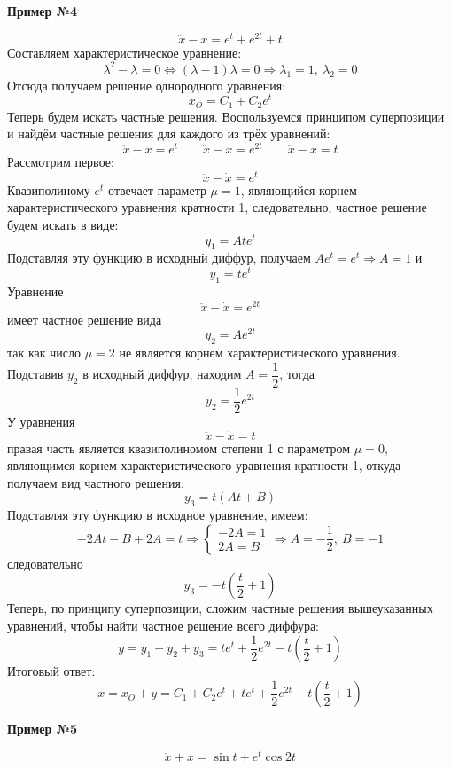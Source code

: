 \documentclass[a4paper,12pt]{article}
\newcommand{\dx}{\dot{x}}
\newcommand{\ddx}{\ddot{x}}
\newcommand{\bto}{\Longrightarrow}
\begin{document}
\textbf{Пример №4}

\[\ddx - \dx = e^t + e^{2t} + t \]
Составляем характеристическое уравнение:
\[\lambda^2 - \lambda = 0 \iff (\lambda - 1)\lambda = 0 \bto \lambda_1 = 1,\ \lambda _2 = 0\]
Отсюда получаем решение однородного уравнения:
\[x_O = C_1 + C_2e^t\]
Теперь будем искать частные решения. 
Воспользуемся принципом суперпозиции и найдём частные решения для каждого из  трёх уравнений:
\[\ddx - \dx = e^t\qquad \ddx  - \dx = e^{2t} \qquad \ddx - \dx = t\]
Рассмотрим первое:
\[\ddx - \dx = e^t\]
Квазиполиному $e^t$ отвечает параметр $\mu = 1$, являющийся корнем характеристического уравнения кратности 1, следовательно, частное решение будем искать в виде:
\[y_1 = Ate^t\]
Подставляя эту функцию в исходный диффур, получаем $Ae^t = e^t \bto A = 1$ и
\[y_1 = te^t\]
Уравнение
\[\ddx - \dx = e^{2t}\]
имеет частное решение вида
\[y_2 = Ae^{2t}\]
так как число $\mu = 2$ не является корнем характеристического уравнения.
Подставив $y_2$ в исходный диффур, находим $A = \dfrac{1}{2}$, тогда
\[y_2 = \dfrac{1}{2}e^{2t}\]
У уравнения
\[\ddx - \dx = t\]
правая часть является квазиполиномом степени 1 с параметром $\mu = 0$, являющимся корнем характеристического уравнения кратности 1, откуда получаем вид частного решения:
\[y_3 = t(At + B)\]
Подставляя эту функцию в исходное уравнение, имеем:
\[-2At - B + 2A = t \bto \begin{cases}
-2A = 1\\
2A = B 
\end{cases} \bto A = -\dfrac{1}{2},\ B = -1\]
следовательно 
\[y_3 = -t\left(\dfrac{t}{2} + 1\right)\]
Теперь, по принципу суперпозиции, сложим частные решения вышеуказанных уравнений, чтобы найти частное решение всего диффура:
\[y = y_1 + y_2 + y_3 = te^t + \dfrac{1}{2}e^{2t} -t\left(\dfrac{t}{2} + 1\right)\]
Итоговый ответ:
\[x = x_O + y = C_1 + C_2e^t + te^t + \dfrac{1}{2}e^{2t} -t\left(\dfrac{t}{2} + 1\right)\]

\textbf{Пример №5}

\[\ddx + x  = \sin t + e^t\cos2t\]
\end{document}
